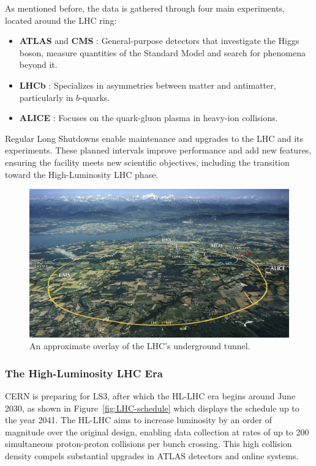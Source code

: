 As mentioned before, the data is gathered through four main experiments, located around the \acs{LHC} ring:
\begin{itemize}
    \item \textbf{ATLAS} \cite{atlas-experiment} and \textbf{CMS} \cite{cms-experiment}: General-purpose detectors that investigate the Higgs boson, measure quantities of the Standard Model and search for phenomena beyond it.
    \item \textbf{LHCb} \cite{lhcb-experiment}: Specializes in asymmetries between matter and antimatter, particularly in $b$-quarks. 
    \item \textbf{ALICE} \cite{alice-experiment}: Focuses on the quark-gluon plasma in heavy-ion collisions.
\end{itemize}

Regular Long Shutdowns enable maintenance and upgrades to the \acs{LHC} and its experiments. These planned intervals improve performance and add new features, ensuring the facility meets new scientific objectives, including the transition toward the High-Luminosity \acs{LHC} phase.

\begin{figure}[H]
\centering
\includegraphics[width=\textwidth]{images/introduction/LHC_map.jpg}
\caption{An approximate overlay of the \acs{LHC}'s underground tunnel. \protect\cite{lhc_tunnel_map}}
\label{fig:LHC}
\end{figure}

\subsubsection{The High-Luminosity \acs{LHC} Era}

\ac{CERN} is preparing for \acf{LS3}, after which the \acs{HL-LHC} era begins around June 2030, as shown in Figure~\ref{fig:LHC-schedule} which displays the schedule up to the year 2041. The \acf{HL-LHC} aims to increase luminosity by an order of magnitude over the original design, enabling data collection at rates of up to 200 simultaneous proton-proton collisions per bunch crossing. This high collision density compels substantial upgrades in \acs{ATLAS} detectors and online systems.

